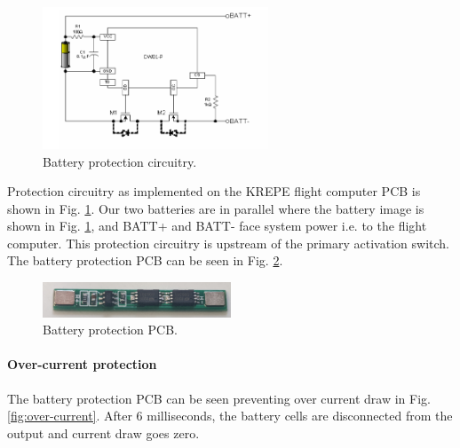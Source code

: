 \documentclass{article}
\begin{document}
\begin{figure}[H]
	\centering
	\includegraphics[width=0.6\textwidth]{images/dw108.png}
	\caption{Battery protection circuitry.}
	\label{fig:bat-protec}
\end{figure}



Protection circuitry as implemented on the KREPE flight computer PCB is shown in Fig. \ref{fig:bat-protec}. Our two batteries are in parallel where the battery image is shown in Fig. \ref{fig:bat-protec}, and BATT+ and BATT- face system power i.e. to the flight computer. This protection circuitry is upstream of the primary activation switch. The battery protection PCB can be seen in Fig. \ref{fig:bat-protect}.


\begin{figure}[H]
	\centering
	\includegraphics[width=0.5\textwidth]{images/new_batt_prot.png}
	\caption{Battery protection PCB.}
	\label{fig:bat-protect}
\end{figure}


\paragraph{Over-current protection}
The battery protection PCB can be seen preventing over current draw in Fig. \ref{fig:over-current}. After 6 milliseconds, the battery cells are disconnected from the output and current draw goes zero.
\end{document}
